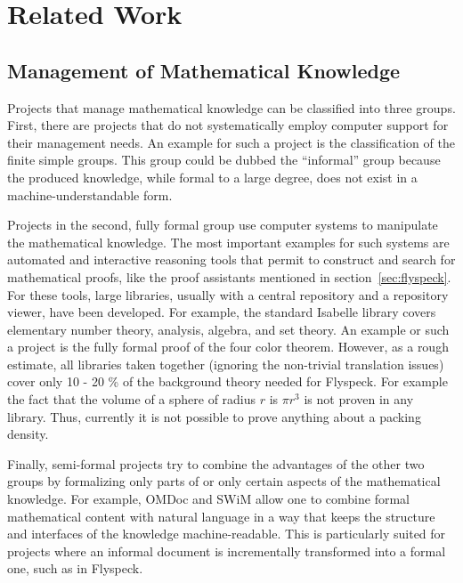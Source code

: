 \section{Related Work}
\label{sec:related}


\subsection{Management of Mathematical Knowledge}
\label{sec:mkm}

Projects that manage mathematical knowledge can be classified into
three groups.  First, there are projects that do not systematically
employ computer support for their management needs.  An example for
such a project is the classification of the finite simple
groups\cite{Gorenstein-Lyons-Salomon:1994}.  This group could be
dubbed the ``informal'' group because the produced knowledge, while
formal to a large degree, does not exist in a machine-understandable
form.

Projects in the second, fully formal group use computer systems to
manipulate the mathematical knowledge.  The most important examples
for such systems are automated and interactive reasoning tools that
permit to construct and search for mathematical proofs, like the proof
assistants mentioned in section~\ref{sec:flyspeck}.  For these tools,
large libraries, usually with a central repository and a repository
viewer, have been developed.  For example, the standard Isabelle
library covers elementary number theory, analysis, algebra, and set
theory. An example or such a project is the fully formal proof of the
four color theorem\cite{Gonthier:2005:FourColor}. However, as a rough
estimate, all libraries taken together (ignoring the non-trivial
translation issues) cover only 10 - 20 \% of the background theory
needed for Flyspeck. For example the fact that the volume of a
sphere of radius $r$ is $\pi r^3$ is not proven in any library.
Thus, currently it is not possible to prove anything about a packing
density.  

Finally, semi-formal projects try to combine the advantages of the
other two groups by formalizing only parts of or only certain aspects
of the mathematical knowledge.  For example, OMDoc and SWiM allow one to
combine formal mathematical content with natural language in a way
that keeps the structure and interfaces of the knowledge
machine-readable.  This is particularly suited for projects where an
informal document is incrementally transformed into a formal one, such
as in Flyspeck.

